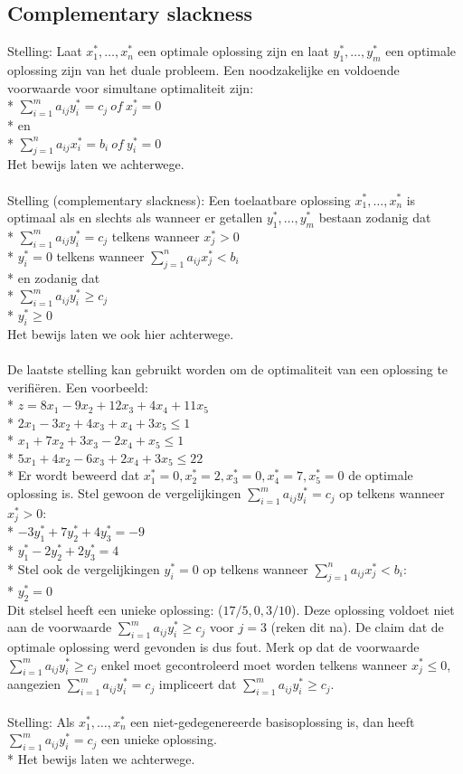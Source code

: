 \documentclass[10pt]{article}
\begin{document}
\subsection{Complementary slackness}
Stelling: Laat $x_1^*, \dots, x_n^*$ een optimale oplossing zijn en laat $y_1^*, \dots, y_m^*$ een optimale oplossing zijn van het duale probleem. Een noodzakelijke en voldoende voorwaarde voor simultane optimaliteit zijn:\\*
$\sum_{i = 1}^m a_{ij}y_i^* = c_j\ of\ x_j^* = 0$\\*
en\\*
$\sum_{j = 1}^n a_{ij}x_i^* = b_i\ of\ y_i^* = 0$\\
Het bewijs laten we achterwege.\\\\
Stelling (complementary slackness): Een toelaatbare oplossing $x_1^*, \dots, x_n^*$ is optimaal als en slechts als wanneer er getallen $y_1^*, \dots, y_m^*$ bestaan zodanig dat\\*
$\sum_{i=1}^ma_{ij}y_i^* = c_j$ telkens wanneer $x_j^* > 0$\\*
$y_i^* = 0$ telkens wanneer $\sum_{j=1}^na_{ij}x_j^* < b_i$\\*
en zodanig dat\\*
$\sum_{i=1}^ma_{ij}y_i^* \ge c_j$\\*
$y_i^* \ge 0$\\
Het bewijs laten we ook hier achterwege.\\\\
De laatste stelling kan gebruikt worden om de optimaliteit van een oplossing te verifi\"eren. Een voorbeeld:\\*
$z = 8x_1 - 9x_2 + 12x_3 + 4x_4 + 11x_5$\\*
$2x_1 - 3x_2 + 4x_3 + x_4 + 3x_5 \le 1$\\*
$x_1 + 7x_2 + 3x_3 - 2x_4 + x_5 \le 1$\\*
$5x_1 + 4x_2 - 6x_3 + 2x_4 + 3x_5 \le 22$\\*
Er wordt beweerd dat $x_1^*=0, x_2^*=2, x_3^*=0, x_4^*=7, x_5^*=0$ de optimale oplossing is. Stel gewoon de vergelijkingen $\sum_{i=1}^ma_{ij}y_i^* = c_j$ op telkens wanneer $x_j^* > 0$:\\*
$-3y_ 1^* + 7y_2^* + 4y_3^* = -9$\\*
$y_1^* - 2y_2^* + 2y_3^* = 4$\\*
Stel ook de vergelijkingen $y_i^* = 0$ op telkens wanneer $\sum_{j=1}^na_{ij}x_j^* < b_i$:\\*
$y_2^* = 0$\\
Dit stelsel heeft een unieke oplossing: ($17/5,0,3/10$). Deze oplossing  voldoet niet aan de voorwaarde $\sum_{i=1}^ma_{ij}y_i^* \ge c_j$ voor $j = 3$ (reken dit na). De claim dat de optimale oplossing werd gevonden is dus fout. Merk op dat de voorwaarde $\sum_{i=1}^ma_{ij}y_i^* \ge c_j$ enkel moet gecontroleerd moet worden telkens wanneer $x_j^* \le 0$, aangezien $\sum_{i=1}^ma_{ij}y_i^* = c_j$ impliceert dat $\sum_{i=1}^ma_{ij}y_i^* \ge c_j$.\\\\
Stelling: Als $x_1^*, \dots, x_n^*$ een niet-gedegenereerde basisoplossing is, dan heeft $\sum_{i=1}^ma_{ij}y_i^* = c_j$ een unieke oplossing.\\*
Het bewijs laten we achterwege.
\end{document}
